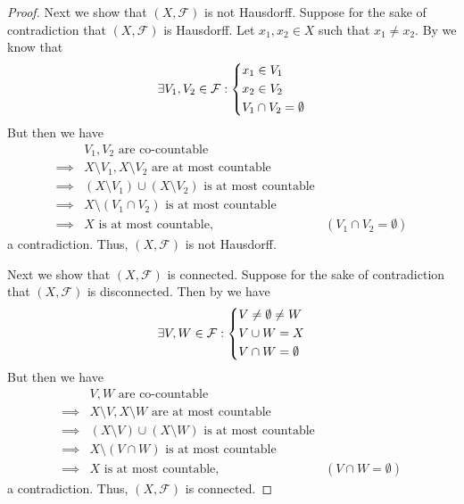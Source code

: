 \begin{proof}
  Next we show that \((X, \mathcal{F})\) is not Hausdorff.
  Suppose for the sake of contradiction that \((X, \mathcal{F})\) is Hausdorff.
  Let \(x_1, x_2 \in X\) such that \(x_1 \neq x_2\).
  By  we know that
  \[
    \exists V_1, V_2 \in \mathcal{F} : \begin{dcases}
      x_1 \in V_1 \\
      x_2 \in V_2 \\
      V_1 \cap V_2 = \emptyset
    \end{dcases}
  \]
  But then we have
  \begin{align*}
             & V_1, V_2 \text{ are co-countable}                                                                  \\
    \implies & X \setminus V_1, X \setminus V_2 \text{ are at most countable}                                     \\
    \implies & (X \setminus V_1) \cup (X \setminus V_2) \text{ is at most countable}                              \\
    \implies & X \setminus (V_1 \cap V_2) \text{ is at most countable}                                            \\
    \implies & X \text{ is at most countable},                                       & (V_1 \cap V_2 = \emptyset)
  \end{align*}
  a contradiction.
  Thus, \((X, \mathcal{F})\) is not Hausdorff.

  Next we show that \((X, \mathcal{F})\) is connected.
  Suppose for the sake of contradiction that \((X, \mathcal{F})\) is disconnected.
  Then by  we have
  \[
    \exists V, W \in \mathcal{F} : \begin{dcases}
      V \neq \emptyset \neq W \\
      V \cup W = X            \\
      V \cap W = \emptyset
    \end{dcases}
  \]
  But then we have
  \begin{align*}
             & V, W \text{ are co-countable}                                                              \\
    \implies & X \setminus V, X \setminus W \text{ are at most countable}                                 \\
    \implies & (X \setminus V) \cup (X \setminus W) \text{ is at most countable}                          \\
    \implies & X \setminus (V \cap W) \text{ is at most countable}                                        \\
    \implies & X \text{ is at most countable},                                   & (V \cap W = \emptyset)
  \end{align*}
  a contradiction.
  Thus, \((X, \mathcal{F})\) is connected.


\end{proof}
